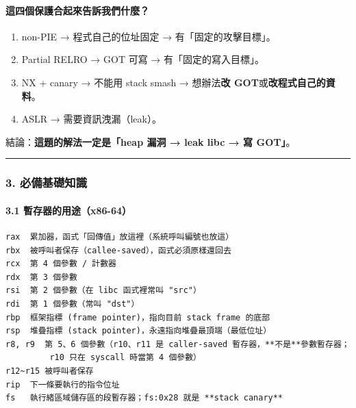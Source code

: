 \documentclass[10pt,a4paper]{article}
\providecommand{\tightlist}{%
  \setlength{\itemsep}{0pt}\setlength{\parskip}{0pt}}
\begin{document}
\paragraph{這四個保護合起來告訴我們什麼？}\label{ux9019ux56dbux500bux4fddux8b77ux5408ux8d77ux4f86ux544aux8a34ux6211ux5011ux4ec0ux9ebc}

\begin{enumerate}
\def\labelenumi{\arabic{enumi}.}
\tightlist
\item
  non-PIE → 程式自己的位址固定 → 有「固定的攻擊目標」。
\item
  Partial RELRO → GOT 可寫 → 有「固定的寫入目標」。
\item
  NX + canary → 不能用 stack smash → 想辦法\textbf{改
  GOT}或\textbf{改程式自己的資料}。
\item
  ASLR → 需要資訊洩漏（leak）。
\end{enumerate}

結論：\textbf{這題的解法一定是「heap 漏洞 → leak libc → 寫 GOT」}。

\begin{center}\rule{0.5\linewidth}{0.5pt}\end{center}

\subsubsection{3.
必備基礎知識}\label{ux5fc5ux5099ux57faux790eux77e5ux8b58}

\paragraph{3.1
暫存器的用途（x86-64）}\label{ux66abux5b58ux5668ux7684ux7528ux9014x86-64}

\begin{Verbatim}[breaklines=true,breakanywhere=true,breakautoindent=false,fontsize=\fontsize{7.0}{9.5}\selectfont]
rax  累加器，函式「回傳值」放這裡（系統呼叫編號也放這）
rbx  被呼叫者保存（callee-saved），函式必須原樣還回去
rcx  第 4 個參數 / 計數器
rdx  第 3 個參數
rsi  第 2 個參數（在 libc 函式裡常叫 "src"）
rdi  第 1 個參數（常叫 "dst"）
rbp  框架指標 (frame pointer)，指向目前 stack frame 的底部
rsp  堆疊指標 (stack pointer)，永遠指向堆疊最頂端（最低位址）
r8, r9  第 5、6 個參數（r10、r11 是 caller-saved 暫存器，**不是**參數暫存器；
         r10 只在 syscall 時當第 4 個參數）
r12~r15 被呼叫者保存
rip  下一條要執行的指令位址
fs   執行緒區域儲存區的段暫存器；fs:0x28 就是 **stack canary**
\end{Verbatim}
\end{document}
